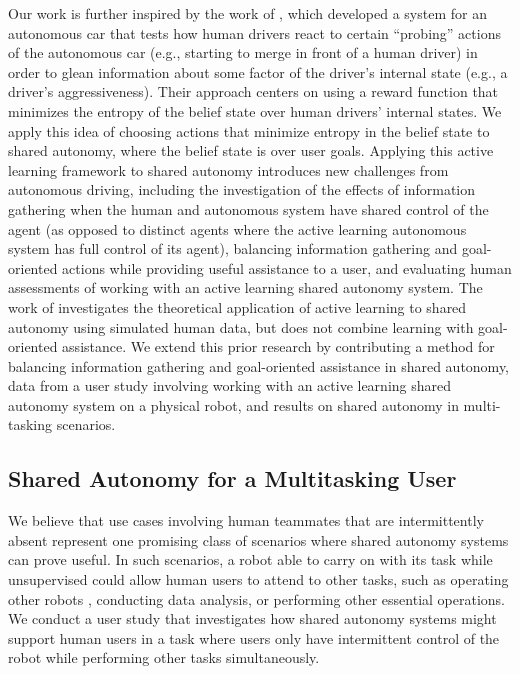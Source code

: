 \documentclass[conference]{IEEEtran}
\begin{document}
Our work is further inspired by the work of \citet{sadigh2016information}, which developed a system for an autonomous car that tests how human drivers react to certain ``probing'' actions of the autonomous car (e.g., starting to merge in front of a human driver) in order to glean information about some factor of the driver's internal state (e.g., a driver's aggressiveness). Their approach centers on using a reward function that minimizes the entropy of the belief state over human drivers' internal states. We apply this idea of choosing actions that minimize entropy in the belief state to shared autonomy, where the belief state is over user goals. Applying this active learning framework to shared autonomy introduces new challenges from autonomous driving, including the investigation of the effects of information gathering when the human and autonomous system have shared control of the agent (as opposed to distinct agents where the active learning autonomous system has full control of its agent), balancing information gathering and goal-oriented actions while providing useful assistance to a user, and evaluating human assessments of working with an active learning shared autonomy system. The work of \citet{landolfi2017exploring} investigates the theoretical application of active learning to shared autonomy using simulated human data, but does not combine learning with goal-oriented assistance. We extend this prior research by contributing a method for balancing information gathering and goal-oriented assistance in shared autonomy, data from a user study involving working with an active learning shared autonomy system on a physical robot, and results on shared autonomy in multi-tasking scenarios.

\subsection{Shared Autonomy for a Multitasking User}
We believe that use cases involving human teammates that are intermittently absent represent one promising class of scenarios where shared autonomy systems can prove useful. In such scenarios, a robot able to carry on with its task while unsupervised could allow human users to attend to other tasks, such as operating other robots \cite{crandall2005validating, cummings2008predicting}, conducting data analysis, or performing other essential operations. We conduct a user study that investigates how shared autonomy systems might support human users in a task where users only have intermittent control of the robot while performing other tasks simultaneously.
\end{document}
